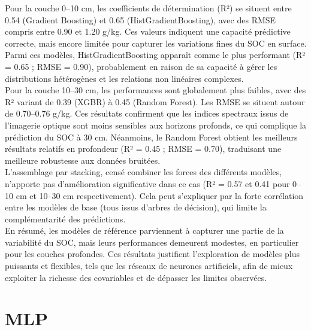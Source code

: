 \documentclass[12pt,a4paper,oneside]{report}
\begin{document}
Pour la couche 0–10 cm, les coefficients de détermination (R²) se situent entre 0.54 (Gradient Boosting) et 0.65 (HistGradientBoosting), avec des RMSE compris entre 0.90 et 1.20 g/kg. Ces valeurs indiquent une capacité prédictive correcte, mais encore limitée pour capturer les variations fines du SOC en surface. Parmi ces modèles, HistGradientBoosting apparaît comme le plus performant (R² = 0.65 ; RMSE = 0.90), probablement en raison de sa capacité à gérer les distributions hétérogènes et les relations non linéaires complexes.
\\
\newline
Pour la couche 10–30 cm, les performances sont globalement plus faibles, avec des R² variant de 0.39 (XGBR) à 0.45 (Random Forest). Les RMSE se situent autour de 0.70–0.76 g/kg. Ces résultats confirment que les indices spectraux issus de l’imagerie optique sont moins sensibles aux horizons profonds, ce qui complique la prédiction du SOC à 30 cm. Néanmoins, le Random Forest obtient les meilleurs résultats relatifs en profondeur (R² = 0.45 ; RMSE = 0.70), traduisant une meilleure robustesse aux données bruitées.
\\
\newline
L’assemblage par stacking, censé combiner les forces des différents modèles, n’apporte pas d’amélioration significative dans ce cas (R² = 0.57 et 0.41 pour 0–10 cm et 10–30 cm respectivement). Cela peut s’expliquer par la forte corrélation entre les modèles de base (tous issus d’arbres de décision), qui limite la complémentarité des prédictions.
\\
\newline
En résumé, les modèles de référence parviennent à capturer une partie de la variabilité du SOC, mais leurs performances demeurent modestes, en particulier pour les couches profondes. Ces résultats justifient l’exploration de modèles plus puissants et flexibles, tels que les réseaux de neurones artificiels, afin de mieux exploiter la richesse des covariables et de dépasser les limites observées.

\section{MLP}
\end{document}
